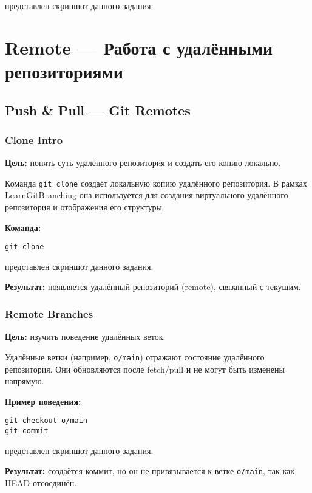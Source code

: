\documentclass[a4paper,12pt]{report}
\begin{document}
 представлен скриншот данного задания.

\section{Remote — Работа с удалёнными репозиториями}

\subsection{Push \& Pull — Git Remotes}

\subsubsection{Clone Intro}
\textbf{Цель:} понять суть удалённого репозитория и создать его копию локально.

Команда \texttt{git clone} создаёт локальную копию удалённого репозитория. В рамках LearnGitBranching она используется для создания виртуального удалённого репозитория и отображения его структуры.

\textbf{Команда:}
\begin{verbatim}
git clone
\end{verbatim}

 представлен скриншот данного задания.

\textbf{Результат:} появляется удалённый репозиторий (remote), связанный с текущим.

\subsubsection{Remote Branches}
\textbf{Цель:} изучить поведение удалённых веток.

Удалённые ветки (например, \texttt{o/main}) отражают состояние удалённого репозитория. Они обновляются после fetch/pull и не могут быть изменены напрямую.

\textbf{Пример поведения:}
\begin{verbatim}
git checkout o/main
git commit
\end{verbatim}

 представлен скриншот данного задания.

\textbf{Результат:} создаётся коммит, но он не привязывается к ветке \texttt{o/main}, так как HEAD отсоединён.
\end{document}
